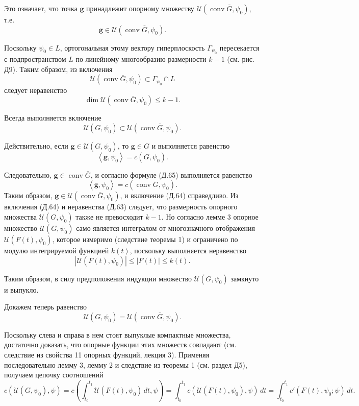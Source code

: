 \documentclass[8pt]{extarticle}
\begin{document}
Это означает, что точка \(\mathbf{g}\) принадлежит опорному множеству \(\mathcal{U}\left( \operatorname{conv}\bar{G},\psi_0 \right)\), т.е.
\[
\mathbf{g} \in \mathcal{U}\left( \operatorname{conv}\bar{G},\psi_0 \right). \tag{Д.62}
\]

Поскольку \(\psi_0 \in L\), ортогональная этому вектору гиперплоскость \(\Gamma_{\psi_0}\) пересекается с подпространством \(L\) по линейному многообразию размерности \(k - 1\) (см. рис. Д9). Таким образом, из включения
\[
\mathcal{U}\left( \operatorname{conv}\bar{G},\psi_0 \right) \subset \Gamma_{\psi_0} \cap L
\]
следует неравенство
\[
\dim \mathcal{U}\left( \operatorname{conv}\bar{G},\psi_0 \right) \leq k - 1. \tag{Д.63}
\]

Всегда выполняется включение
\[
\mathcal{U}\left( G,\psi_0 \right) \subset \mathcal{U}\left( \operatorname{conv}\bar{G},\psi_0 \right). \tag{Д.64}
\]

Действительно, если \(\mathbf{g} \in \mathcal{U}\left( G,\psi_0 \right)\), то \(\mathbf{g} \in G\) и выполняется равенство
\[
\left\langle \mathbf{g},\psi_0 \right\rangle = c\left( G,\psi_0 \right). \tag{Д.65}
\]

Следовательно, \(\mathbf{g} \in \operatorname{conv}\bar{G}\), и согласно формуле (Д.65) выполняется равенство
\[
\left\langle \mathbf{g},\psi_0 \right\rangle = c\left( \operatorname{conv}\bar{G},\psi_0 \right).
\]
Таким образом, \(\mathbf{g} \in \mathcal{U}\left( \operatorname{conv}\bar{G},\psi_0 \right)\), и включение (Д.64) справедливо. Из включения (Д.64) и неравенства (Д.63) следует, что размерность опорного множества \(\mathcal{U}\left( G,\psi_0 \right)\) также не превосходит \(k - 1\). Но согласно лемме 3 опорное множество \(\mathcal{U}\left( G,\psi_0 \right)\) само является интегралом от многозначного отображения \(\mathcal{U}\left( F(t),\psi_0 \right)\), которое измеримо (следствие теоремы 1) и ограничено по модулю интегрируемой функцией \(k(t)\), поскольку выполняется неравенство
\[
\left| \mathcal{U}\left( F(t),\psi_0 \right) \right| \leq \left| F(t) \right| \leq k(t).
\]

Таким образом, в силу предположения индукции множество \(\mathcal{U}\left( G,\psi_0 \right)\) замкнуто и выпукло.

Докажем теперь равенство
\[
\mathcal{U}\left( G,\psi_0 \right) = \mathcal{U}\left( \operatorname{conv}\bar{G},\psi_0 \right). \tag{Д.66}
\]

Поскольку слева и справа в нем стоят выпуклые компактные множества, достаточно доказать, что опорные функции этих множеств совпадают (см. следствие из свойства 11 опорных функций, лекция 3). Применяя последовательно лемму 3, лемму 2 и следствие из теоремы 1 (см. раздел Д5), получаем цепочку соотношений
\[
c\left( \mathcal{U}\left( G,\psi_0 \right),\psi \right)
= c\left( \int_{t_0}^{t_1}\mathcal{U}\left( F(t),\psi_0 \right)\,dt,\psi \right)
= \int_{t_0}^{t_1}c\left( \mathcal{U}\left( F(t),\psi_0 \right),\psi \right)\,dt
= \int_{t_0}^{t_1} c'\left( F(t),\psi_0;\psi \right)\,dt. \tag{Д.67}
\]
\end{document}
